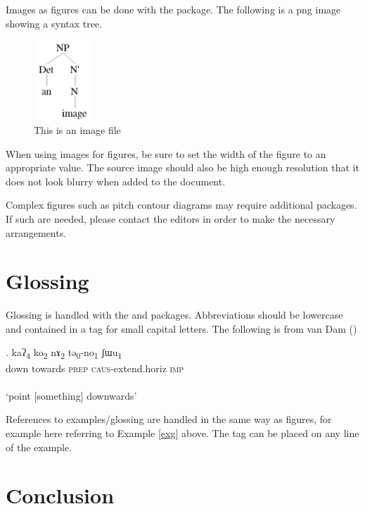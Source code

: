 Images as figures can be done with the  package. The following is a png image showing a syntax tree.

\begin{figure}[htpb!]
    \centering
    \includegraphics[width=6em]{fig}
    \caption{This is an image file}
\end{figure}

When using images for figures, be sure to set the width of the figure to an appropriate value. The source image should also be high enough resolution that it does not look blurry when added to the document.

Complex figures such as pitch contour diagrams may require additional packages. If such are needed, please contact the editors in order to make the necessary arrangements.

\section{Glossing}

Glossing is handled with the  and  packages. Abbreviations should be lowercase and contained in a  tag for small capital letters. The following is from van Dam (\citeyear{vandam2019syntax})

\exg.   kaʔ\textsubscript{4} ko\textsubscript{2} nɤ\textsubscript{2} tə\textsubscript{0}-no\textsubscript{1} ʃɯu\textsubscript{1}\\
    down towards {\textsc{prep}} {\textsc{caus}}-extend.horiz {\textsc{imp}} \\~\\
    `point [something] downwards' \label{exg}

References to examples/glossing are handled in the same way as figures, for example here referring to Example \ref{exg} above. The  tag can be placed on any line of the example.

\section{Conclusion}

